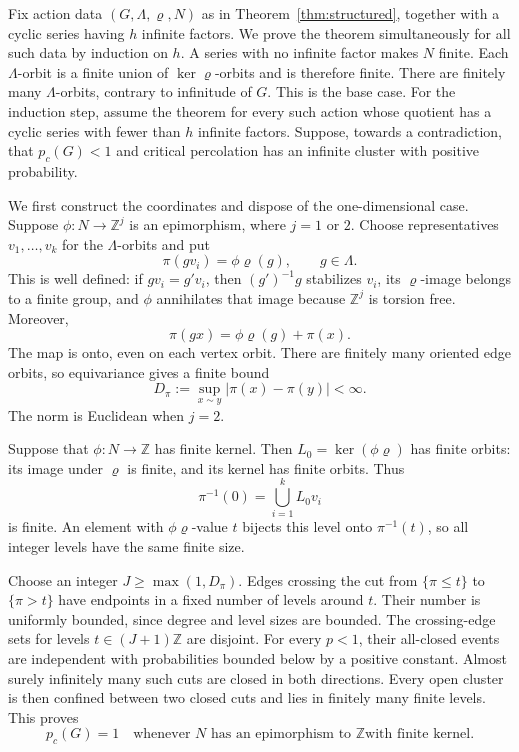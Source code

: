 \documentclass[11pt]{article}
\theoremstyle{definition}
\begin{document}
Fix action data \((G,\Lambda,\varrho,N)\) as in
Theorem~\ref{thm:structured}, together with a cyclic series having
\(h\) infinite factors. We prove the theorem simultaneously for all
such data by induction on \(h\). A series with no infinite factor
makes \(N\) finite. Each $\Lambda$-orbit is a finite union of
$\ker\varrho$-orbits and is therefore finite. There are finitely
many $\Lambda$-orbits, contrary to infinitude of $G$.
This is the base case. For the induction step, assume the theorem
for every such action whose quotient has a cyclic series with fewer
than \(h\) infinite factors. Suppose, towards a contradiction, that
\(p_c(G)<1\) and critical percolation has an infinite cluster with
positive probability.

We first construct the coordinates and dispose of the one-dimensional
case. Suppose $\phi:N\to\mathbb Z^j$ is an epimorphism, where $j=1$ or $2$.
Choose representatives $v_1,\ldots,v_k$ for the $\Lambda$-orbits and
put
\begin{equation}\label{eq:equivariant-projection}
 \pi(gv_i)=\phi\varrho(g),\qquad g\in\Lambda.
\end{equation}
This is well defined: if $gv_i=g'v_i$, then $(g')^{-1}g$ stabilizes
$v_i$, its $\varrho$-image belongs to a finite group, and $\phi$
annihilates that image because $\mathbb Z^j$ is torsion free. Moreover,
\begin{equation}\label{eq:projection-equivariance}
 \pi(gx)=\phi\varrho(g)+\pi(x).
\end{equation}
The map is onto, even on each vertex orbit. There are finitely many
oriented edge orbits, so equivariance gives a finite bound
\begin{equation}\label{eq:projection-edge-bound}
 D_\pi:=\sup_{x\sim y}|\pi(x)-\pi(y)|<\infty.
\end{equation}
The norm is Euclidean when $j=2$.

Suppose that $\phi:N\to\mathbb Z$ has finite kernel.
Then $L_0=\ker(\phi\varrho)$ has finite orbits: its image under
$\varrho$ is finite, and its kernel has finite orbits. Thus
\[
 \pi^{-1}(0)=\bigcup_{i=1}^k L_0v_i
\]
is finite. An element with $\phi\varrho$-value $t$ bijects this level
onto $\pi^{-1}(t)$, so all integer levels have the same finite size.

Choose an integer $J\ge\max(1,D_\pi)$. Edges crossing the cut from
$\{\pi\le t\}$ to $\{\pi>t\}$ have endpoints in a fixed number of
levels around $t$. Their number is uniformly bounded, since degree
and level sizes are bounded. The crossing-edge sets for levels
$t\in(J+1)\mathbb Z$ are disjoint. For every $p<1$, their all-closed
events are independent with probabilities bounded below by a positive
constant. Almost surely infinitely many such cuts are closed in both
directions. Every open cluster is then confined between two closed
cuts and lies in finitely many finite levels. This proves
\begin{equation}\label{eq:cyclic-critical-one}
 p_c(G)=1
 \quad\text{whenever $N$ has an epimorphism to $\mathbb Z$
 with finite kernel.}
\end{equation}
\end{document}
